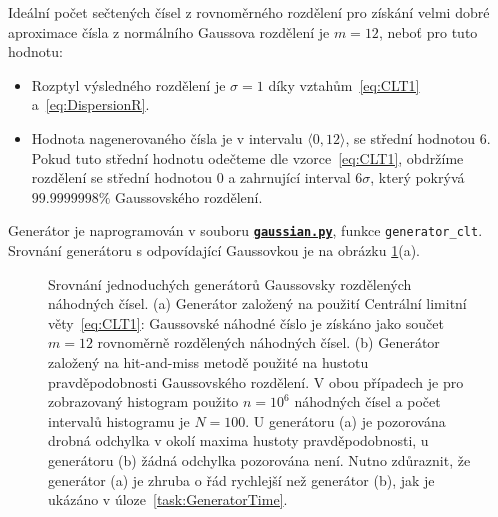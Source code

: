 \documentclass[a4paper,11pt,twoside]{article}
\def\code#1{\textnormal{\texttt{#1}}}
\def\ghfile#1#2{\textnormal{\textbf{\texttt{\href{https://github.com/PavelStransky/PCInPhysics/blob/main/#1#2}{#2}}}}}
\theoremstyle{red}
\theoremstyle{green}
\begin{document}
    \begin{solution}
        Ideální počet sečtených čísel z rovnoměrného rozdělení pro získání velmi dobré aproximace čísla z normálního Gaussova rozdělení je $m=12$, neboť pro tuto hodnotu:
        \begin{itemize}
            \item Rozptyl výsledného rozdělení je $\sigma=1$ díky vztahům~\eqref{eq:CLT1} a~\eqref{eq:DispersionR}.
            \item Hodnota nagenerovaného čísla je v intervalu $\langle0,12\rangle$, se střední hodnotou $6$.
                Pokud tuto střední hodnotu odečteme dle vzorce~\eqref{eq:CLT1}, obdržíme rozdělení se střední hodnotou $0$ a zahrnující interval $6\sigma$, který pokrývá $99.9999998\%$ Gaussovského rozdělení.
        \end{itemize}
        Generátor je naprogramován v souboru \ghfile{python/histogram/}{gaussian.py}, funkce \code{generator_clt}.
        Srovnání generátoru s odpovídající Gaussovkou je na obrázku \ref{fig:GaussianGenerator}(a).

        \begin{figure}[!htb]
            \begin{subfigure}{0.49\linewidth}
                \centering{}
                \caption{}
            \end{subfigure}
            \begin{subfigure}{0.49\linewidth}
                \centering{}
                \caption{}
            \end{subfigure}
            \caption{
                \protect\small
                Srovnání jednoduchých generátorů Gaussovsky rozdělených náhodných čísel. 
                (a) Generátor založený na použití Centrální limitní věty~\eqref{eq:CLT1}: Gaussovské náhodné číslo je získáno jako součet $m=12$ rovnoměrně rozdělených náhodných čísel.
                (b) Generátor založený na hit-and-miss metodě použité na hustotu pravděpodobnosti Gaussovského rozdělení.
                V obou případech je pro zobrazovaný histogram použito  $n=10^{6}$ náhodných čísel a počet intervalů histogramu je $N=100$.
                U generátoru (a) je pozorována drobná odchylka v okolí maxima hustoty pravděpodobnosti, u generátoru (b) žádná odchylka pozorována není.
                Nutno zdůraznit, že generátor (a) je zhruba o řád rychlejší než generátor (b), jak je ukázáno v úloze~\ref{task:GeneratorTime}.
            }
            \label{fig:GaussianGenerator}
        \end{figure}    
    \end{solution}
    
\end{document}
